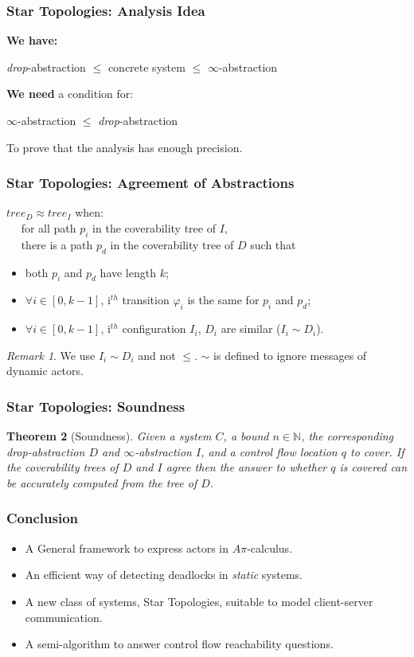 \documentclass{beamer}
\newtheorem{thm}{Theorem}[section]
\theoremstyle{remark}
\newtheorem{rem}[thm]{Remark}
\theoremstyle{definition}
\newcommand{\dabs}{\emph{drop}-abstraction}
\newcommand{\iabs}{$\infty$-abstraction}
\begin{document}
\begin{frame}
\frametitle{Star Topologies: Analysis Idea}
\textbf{We have:}
\begin{center}
\dabs{} $\leq$ concrete system $\leq$ \iabs{}
\end{center}

\vspace{10pt}

\textbf{We need} a condition for:
\begin{center}
\iabs{} $\leq$ \dabs{}
\end{center}
To prove that the analysis has enough precision.
\end{frame}


\begin{frame}
\frametitle{Star Topologies: Agreement of Abstractions}
\alert{$tree_D \approx tree_I$} when:\\
\mbox{} ~~ for all path $p_i$ in the coverability tree of $I$, \\
\mbox{} ~~ there is a path $p_d$ in the coverability tree of $D$ such that
\begin{itemize}
\item both $p_i$ and $p_d$ have length $k$;
\item $\forall i \in [0,k-1]$, i$^{th}$ transition $\varphi_i$ is the same for $p_i$ and $p_d$;
\item $\forall i \in [0,k-1]$, i$^{th}$ configuration $I_i$, $D_i$ are similar ($I_i \sim D_i$).
\end{itemize}

\begin{rem}
We use $I_i \sim D_i$ and not $\leq$.
$\sim$ is defined to ignore messages of dynamic actors.
\end{rem}

\end{frame}

\begin{frame}
\frametitle{Star Topologies: Soundness}
\begin{thm}[Soundness]
\label{thmSound}
Given a system $C$, a bound $n \in \mathbb{N}$, the corresponding \dabs{} $D$ and \iabs{} $I$, and a \alert{control flow location $q$} to cover.
If the coverability trees of $D$ and $I$ agree then the answer to whether $q$ is covered can be accurately computed from the tree of $D$.
\end{thm}
\end{frame}

\begin{frame} 
  \frametitle{Conclusion}
  \begin{itemize}
  \item A General framework to express actors in $A\pi$-calculus.
  \item An efficient way of detecting deadlocks in \emph{static} systems.
  \item A new class of systems, Star Topologies, suitable to model client-server communication.
  \item A semi-algorithm to answer control flow reachability questions.
  \end{itemize}
\end{frame} 
\end{document}
